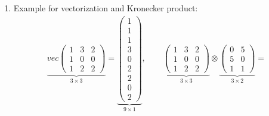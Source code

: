 \begin{enumerate}
\item Example for vectorization and Kronecker product:
\begin{align*}
    \underbrace{vec\begin{pmatrix} 1&3&2\\1&0&0\\1&2&2 \end{pmatrix}}_{3\times3} = \underbrace{\begin{pmatrix} 1 \\1 \\1 \\3 \\0 \\2 \\2 \\ 0 \\2\end{pmatrix}}_{9\times1}, \qquad 
    \underbrace{\begin{pmatrix} 1&3&2\\1&0&0\\1&2&2 \end{pmatrix}}_{3\times3} \otimes \underbrace{\begin{pmatrix}0&5\\5&0\\1&1 \end{pmatrix}}_{3\times2} =

\end{align*}
\end{enumerate}
